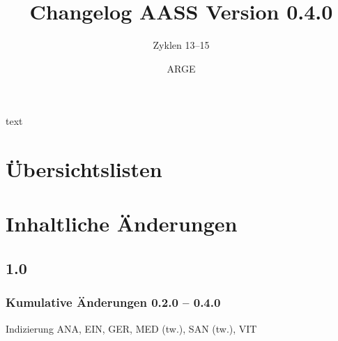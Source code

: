 \documentclass[ngerman,a4paper,fontsize=9pt,BCOR=0cm,DIV=11,headings=big,draft=no]{scrreprt}
\author{ARGE \AASS}
\title{Changelog AASS Version 0.4.0}
\subtitle{Zyklen 13--15}
\begin{document}
\maketitle

\tableofcontents

text







\chapter{Übersichtslisten}










\chapter{Inhaltliche Änderungen}



\section{1.0}


\subsection{Kumulative Änderungen 0.2.0 -- 0.4.0}
Indizierung ANA, EIN, GER, MED (tw.), SAN (tw.),
VIT
\end{document}
